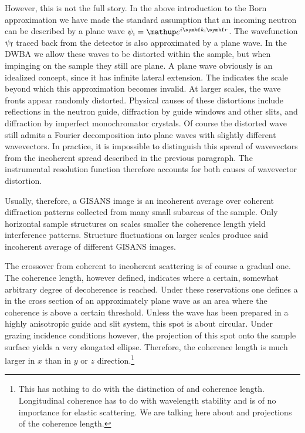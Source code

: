 However, this is not the full story.
In the above introduction to the Born approximation
we have made the standard assumption
that an incoming neutron can be described by a plane wave
$\psi_\ti=\e^{i\k_\ti\r}$.
The wavefunction $\psi_{\text{f}}$ traced back from the detector is also
approximated by a plane wave.
In the DWBA we allow these waves to be distorted within the sample,
but when impinging on the sample they still are plane.
A plane wave obviously is an idealized concept,
since it has infinite lateral extension.
The  indicates the scale
beyond which this approximation becomes invalid.
At larger scales, the wave fronts appear randomly distorted.
Physical causes of these distortions include
reflections in the neutron guide,
diffraction by guide windows and other slits,
and diffraction by imperfect monochromator crystals.
Of course the distorted wave still admits a Fourier decomposition
into plane waves with slightly different wavevectors.
In practice, it is impossible to distinguish this spread of wavevectors
from the incoherent spread described in the previous paragraph.
The instrumental resolution function therefore
accounts for both causes of wavevector distortion.
%

Usually, therefore, a GISANS image is an incoherent average
over coherent diffraction patterns collected from
many small subareas of the sample.
Only horizontal sample structures on scales smaller the coherence length
yield interference patterns.
Structure fluctuations on larger scales
produce said incoherent average of different GISANS images.

The crossover from coherent to incoherent scattering is of course
a gradual one.
The coherence length, however defined,
indicates where a certain, somewhat arbitrary degree
of decoherence is reached.
Under these reservations
one defines a 
in the cross section of an approximately plane wave
as an area where the coherence is above a certain threshold.
Unless the wave has been prepared in a highly anisotropic guide and slit system,
this spot is about circular.
Under grazing incidence conditions however,
the projection of this spot onto the sample surface
yields a very elongated ellipse.
Therefore, the coherence length is much larger in $x$ than
in $y$ or $z$ direction.\footnote
{This has nothing to do with the distinction of
   and  coherence length.
  Longitudinal coherence has to do with wavelength stability
  and is of no importance for elastic scattering.
  We are talking here about  and 
  projections of the  coherence length.}



%
